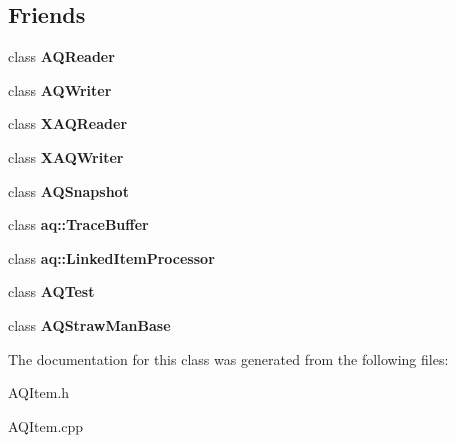 \subsection*{Friends}
\begin{DoxyCompactItemize}
\item 
class {\bfseries A\+Q\+Reader}\hypertarget{class_a_q_item_a846a72114e5337de444fd4ef617e8fc2}{}\label{class_a_q_item_a846a72114e5337de444fd4ef617e8fc2}

\item 
class {\bfseries A\+Q\+Writer}\hypertarget{class_a_q_item_af06d9ff3c550f5e56ca5f6ca0c12db6c}{}\label{class_a_q_item_af06d9ff3c550f5e56ca5f6ca0c12db6c}

\item 
class {\bfseries X\+A\+Q\+Reader}\hypertarget{class_a_q_item_a2f01ef455aefd09d46a49746262759d2}{}\label{class_a_q_item_a2f01ef455aefd09d46a49746262759d2}

\item 
class {\bfseries X\+A\+Q\+Writer}\hypertarget{class_a_q_item_a50c9367cbf2f427d33949023a0ec4c96}{}\label{class_a_q_item_a50c9367cbf2f427d33949023a0ec4c96}

\item 
class {\bfseries A\+Q\+Snapshot}\hypertarget{class_a_q_item_a2f333d9188156b1bd94bce1fa73a38e0}{}\label{class_a_q_item_a2f333d9188156b1bd94bce1fa73a38e0}

\item 
class {\bfseries aq\+::\+Trace\+Buffer}\hypertarget{class_a_q_item_aaaed3688bb4cfc2496b3204ca4388b6a}{}\label{class_a_q_item_aaaed3688bb4cfc2496b3204ca4388b6a}

\item 
class {\bfseries aq\+::\+Linked\+Item\+Processor}\hypertarget{class_a_q_item_a726d915ae4e0c3576ddb9a3899d76d0b}{}\label{class_a_q_item_a726d915ae4e0c3576ddb9a3899d76d0b}

\item 
class {\bfseries A\+Q\+Test}\hypertarget{class_a_q_item_ac28a91f88be754d785cda9b1b23fb17d}{}\label{class_a_q_item_ac28a91f88be754d785cda9b1b23fb17d}

\item 
class {\bfseries A\+Q\+Straw\+Man\+Base}\hypertarget{class_a_q_item_a6db0b94f3c31d8a168937c85eb81515f}{}\label{class_a_q_item_a6db0b94f3c31d8a168937c85eb81515f}

\end{DoxyCompactItemize}


The documentation for this class was generated from the following files\+:\begin{DoxyCompactItemize}
\item 
A\+Q\+Item.\+h\item 
A\+Q\+Item.\+cpp\end{DoxyCompactItemize}
